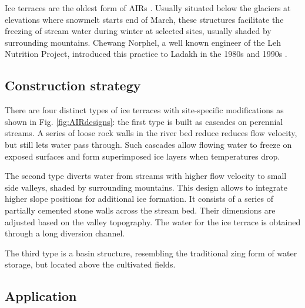 Ice terraces are the oldest form of AIRs \citep{norphelArtificialGlacierHigh2009}. Usually situated below the
glaciers at elevations where snowmelt starts end of March, these structures facilitate the freezing of stream
water during winter at selected sites, usually shaded by surrounding mountains. Chewang Norphel, a well known
engineer of the Leh Nutrition Project, introduced this practice to Ladakh in the 1980s and 1990s
\citep{vinceGlacierMan2009}.

\subsection{Construction strategy}

There are four distinct types of ice terraces with site-specific modifications as shown in Fig.
\ref{fig:AIRdesigns}: the first type is built as cascades on perennial streams. A series of loose rock walls in
the river bed reduce reduces flow velocity, but still lets water pass through. Such cascades allow flowing water
to freeze on exposed surfaces and form superimposed ice layers when temperatures drop. 

The second type diverts water from streams with higher flow velocity to small side valleys, shaded by
surrounding mountains. This design allows to integrate higher slope positions for additional ice formation. It
consists of a series of partially cemented stone walls across the stream bed. Their dimensions are adjusted
based on the valley topography. The water for the ice terrace is obtained through a long diversion channel. 

The third type is a basin structure, resembling the traditional {zing} form of water storage, but located
above the cultivated fields.

\subsection{Application}

